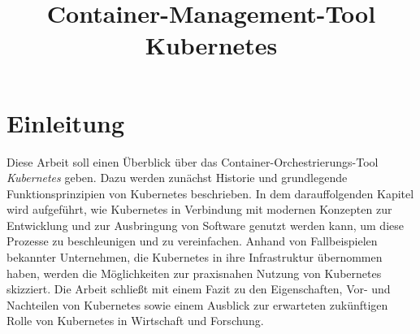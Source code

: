 \documentclass[11pt,a4paper]{article}
\title{Container-Management-Tool Kubernetes}
\begin{document}

\tableofcontents
\thispagestyle{empty}
\newpage



\clearpage
{}
\section{Einleitung}
\label{sec:einleitung}
Diese Arbeit soll einen Überblick über das Container-Orchestrierungs-Tool \emph{Kubernetes} geben.
Dazu werden zunächst Historie und grundlegende Funktionsprinzipien von Kubernetes beschrieben.
In dem darauffolgenden Kapitel wird aufgeführt, wie Kubernetes in Verbindung mit modernen
Konzepten zur Entwicklung und zur Ausbringung von Software genutzt werden kann,
um diese Prozesse zu beschleunigen und zu vereinfachen.
Anhand von Fallbeispielen bekannter Unternehmen, die Kubernetes in ihre Infrastruktur übernommen haben,
werden die Möglichkeiten zur praxisnahen Nutzung von Kubernetes skizziert.
Die Arbeit schließt mit einem Fazit zu den Eigenschaften, Vor- und Nachteilen
von Kubernetes sowie einem Ausblick zur erwarteten zukünftigen Rolle von Kubernetes
in Wirtschaft und Forschung.
\end{document}
